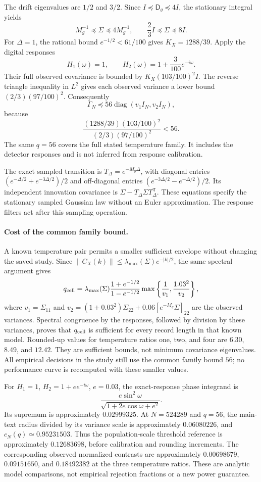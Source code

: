 The drift eigenvalues are $1/2$ and $3/2$. Since $I\preceq\mathsf D_g\preceq4I$, the stationary integral yields
\[
 M_g^{-1}\preceq\Sigma\preceq4M_g^{-1},
 \qquad \frac23 I\preceq\Sigma\preceq8I.
\]
For $\Delta=1$, the rational bound $e^{-1/2}<61/100$ gives $K_X=1288/39$. Apply the digital responses
\[
 H_1(\omega)=1,\qquad H_2(\omega)=1+\frac3{100}e^{-i\omega}.
\]
Their full observed covariance is bounded by $K_X(103/100)^2I$. The reverse triangle inequality in $L^2$ gives each observed variance a lower bound $(2/3)(97/100)^2$. Consequently
\begin{equation}
 \Gamma_N\preceq56\operatorname{diag}(v_1I_N,v_2I_N),
 \label{phys16:gyrator-q}
\end{equation}
because
\[
 \frac{(1288/39)(103/100)^2}{(2/3)(97/100)^2}<56.
\]
The same $q=56$ covers the full stated temperature family. It includes the detector responses and is not inferred from response calibration.

The exact sampled transition is $T_\Delta=e^{-M_g\Delta}$, with diagonal entries $(e^{-\Delta/2}+e^{-3\Delta/2})/2$ and off-diagonal entries $(e^{-3\Delta/2}-e^{-\Delta/2})/2$. Its independent innovation covariance is $\Sigma-T_\Delta\Sigma T_\Delta^{\mathsf T}$. These equations specify the stationary sampled Gaussian law without an Euler approximation. The response filters act after this sampling operation.

\paragraph{Cost of the common family bound.}
A known temperature pair permits a smaller sufficient envelope without changing the saved study. Since $\|C_X(k)\|\le\lambda_{\max}(\Sigma)e^{-|k|/2}$, the same spectral argument gives
\[
 q_{\rm cell}=\lambda_{\max}(\Sigma)
 \frac{1+e^{-1/2}}{1-e^{-1/2}}
 \max\left\{\frac1{v_1},\frac{1.03^2}{v_2}\right\},
\]
where $v_1=\Sigma_{11}$ and
$v_2=(1+0.03^2)\Sigma_{22}+0.06[e^{-M_g}\Sigma]_{22}$ are the observed variances. Spectral congruence by the responses, followed by division by these variances, proves that $q_{\rm cell}$ is sufficient for every record length in that known model. Rounded-up values for temperature ratios one, two, and four are $6.30$, $8.49$, and $12.42$. They are sufficient bounds, not minimum covariance eigenvalues. All empirical decisions in the study still use the common family bound $56$; no performance curve is recomputed with these smaller values.

For $H_1=1$, $H_2=1+e e^{-i\omega}$, $e=0.03$, the exact-response phase integrand is
\[
 \frac{e\sin^2\omega}{\sqrt{1+2e\cos\omega+e^2}}.
\]
Its supremum is approximately $0.02999325$. At $N=524289$ and $q=56$, the main-text radius divided by its variance scale is approximately $0.06080226$, and $c_N(q)\simeq0.95231503$. Thus the population-scale threshold reference is approximately $0.12683698$, before calibration and rounding increments. The corresponding observed normalized contrasts are approximately $0.00698679$, $0.09151650$, and $0.18492382$ at the three temperature ratios. These are analytic model comparisons, not empirical rejection fractions or a new power guarantee.

